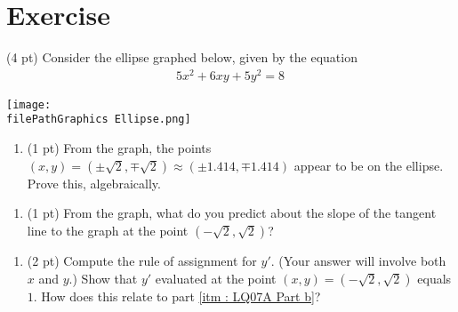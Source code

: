 %
%
%
%

\section{Exercise}


(4 pt) Consider the ellipse graphed below, given by the equation
\begin{align}
5 x^{2} + 6 x y + 5 y^{2}
=
8%
\label{eq : LQ07A Equation}
\end{align}
\begin{center}
\texttt{[image: \\filePathGraphics Ellipse.png]}
\end{center}

\begin{enumerate}[label=(\alph*)]
\item\label{itm : LQ07A Part a} (1 pt) From the graph, the points $(x,y) = (\pm{}\sqrt{2},\mp{}\sqrt{2}) \approx (\pm{}1.414,\mp{}1.414)$ appear to be on the ellipse. Prove this, algebraically.
\end{enumerate}

\spaceSolution{1in}{%
}%



\begin{enumerate}[resume,label=(\alph*)]
\item\label{itm : LQ07A Part b} (1 pt) From the graph, what do you predict about the slope of the tangent line to the graph at the point $(-\sqrt{2},\sqrt{2})$?
\end{enumerate}

\spaceSolution{1in}{%
}%



\begin{enumerate}[resume,label=(\alph*)]
\item\label{itm : LQ07A Part c} (2 pt) Compute the rule of assignment for $y'$. (Your answer will involve both $x$ and $y$.) Show that $y'$ evaluated at the point $(x,y) = (-\sqrt{2},\sqrt{2})$ equals $1$. How does this relate to part \ref{itm : LQ07A Part b}?
\end{enumerate}

\spaceSolution{1in}{%
}%